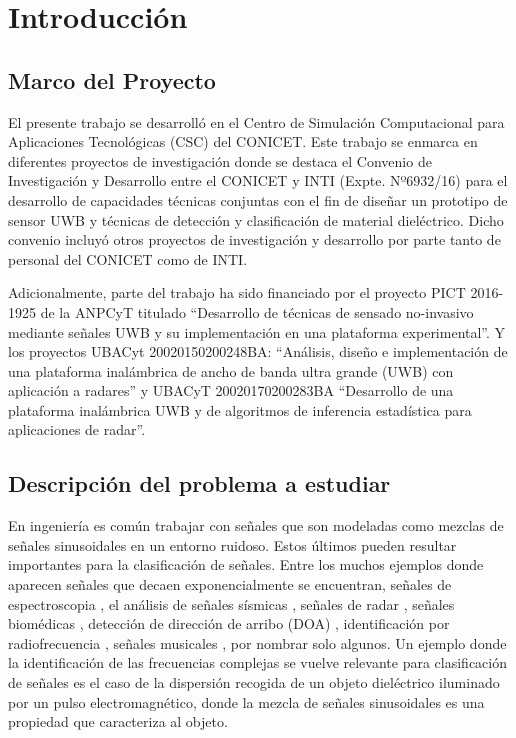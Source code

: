 \chapter{Introducción}\label{chap:Introduccion}

\section{Marco del Proyecto}
El presente trabajo se desarrolló en el Centro de Simulación Computacional para Aplicaciones Tecnológicas (CSC) del CONICET. Este trabajo se enmarca en diferentes proyectos de investigación donde se destaca el Convenio de Investigación y Desarrollo entre el CONICET y INTI  (Expte. Nº6932/16) para el desarrollo de capacidades técnicas conjuntas con el fin de diseñar un prototipo de sensor UWB y técnicas de detección y clasificación de material dieléctrico. Dicho convenio incluyó otros proyectos de investigación y desarrollo por parte tanto de personal del CONICET como de INTI.

Adicionalmente, parte del trabajo ha sido financiado por el proyecto PICT 2016-1925 de la ANPCyT titulado ``Desarrollo de técnicas de sensado no-invasivo mediante señales UWB y su implementación en una plataforma experimental''. Y los proyectos UBACyt 20020150200248BA: ``Análisis, diseño e implementación de una plataforma inalámbrica de ancho de banda ultra grande (UWB) con aplicación a radares'' y UBACyT 20020170200283BA ``Desarrollo de una plataforma inalámbrica UWB y de algoritmos de inferencia estadística para aplicaciones de radar''.



\section{Descripción del problema a estudiar}

En ingeniería es común trabajar con señales que son modeladas como mezclas de señales sinusoidales en un entorno ruidoso. Estos últimos pueden resultar importantes para la clasificación de señales. Entre los muchos ejemplos donde aparecen señales que decaen exponencialmente se encuentran, señales de espectroscopia \cite{Gudmundson2012}, el análisis de señales sísmicas \cite{Soltaninejad2020}, señales de radar \cite{Cuyt2020, Sarkar2000}, señales biomédicas \cite{Bannis2014, Chon2001}, detección de dirección de arribo (DOA) \cite{Knaepkens2020}, identificación por radiofrecuencia \cite{Rezaiesarlak2013}, señales musicales \cite{Laroche1993}, por nombrar solo algunos. Un ejemplo donde la identificación de las frecuencias complejas se vuelve relevante para clasificación de señales es el caso de la dispersión recogida de un objeto dieléctrico iluminado por un pulso electromagnético, donde la mezcla de señales sinusoidales es una propiedad que caracteriza al objeto.



